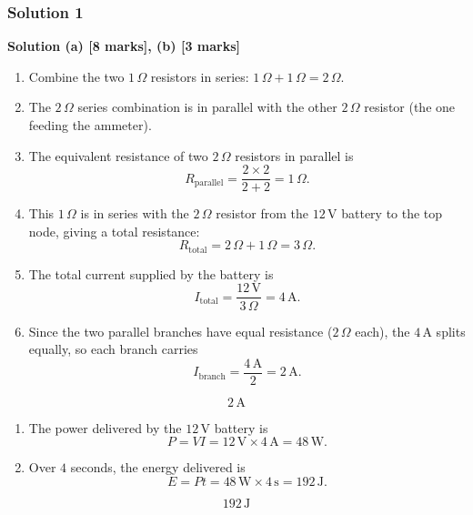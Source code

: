 \documentclass{article}
\begin{document}
\subsubsection{Solution 1}

\textbf{Solution (a) [8 marks], (b) [3 marks]}

\begin{enumerate}
    \item Combine the two \(1\,\Omega\) resistors in series: \(1\,\Omega + 1\,\Omega = 2\,\Omega\).
    \item The \(2\,\Omega\) series combination is in parallel with the other \(2\,\Omega\) resistor (the one feeding the ammeter).
    \item The equivalent resistance of two \(2\,\Omega\) resistors in parallel is 
    \[
    R_{\text{parallel}} = \frac{2 \times 2}{2 + 2} = 1\,\Omega.
    \]
    \item This \(1\,\Omega\) is in series with the \(2\,\Omega\) resistor from the \(12\,\mathrm{V}\) battery to the top node, giving a total resistance:
    \[
    R_{\text{total}} = 2\,\Omega + 1\,\Omega = 3\,\Omega.
    \]
    \item The total current supplied by the battery is 
    \[
    I_{\text{total}} = \frac{12\,\mathrm{V}}{3\,\Omega} = 4\,\mathrm{A}.
    \]
    \item Since the two parallel branches have equal resistance (\(2\,\Omega\) each), the \(4\,\mathrm{A}\) splits equally, so each branch carries 
    \[
    I_{\text{branch}} = \frac{4\,\mathrm{A}}{2} = 2\,\mathrm{A}.
    \]
\end{enumerate}

\[
\boxed{2\,\mathrm{A}}
\]

\begin{enumerate}
    \item The power delivered by the \(12\,\mathrm{V}\) battery is 
    \[
    P = VI = 12\,\mathrm{V} \times 4\,\mathrm{A} = 48\,\mathrm{W}.
    \]
    \item Over \(4\) seconds, the energy delivered is 
    \[
    E = P t = 48\,\mathrm{W} \times 4\,\mathrm{s} = 192\,\mathrm{J}.
    \]
\end{enumerate}

\[
\boxed{192\,\mathrm{J}}
\]
\end{document}
